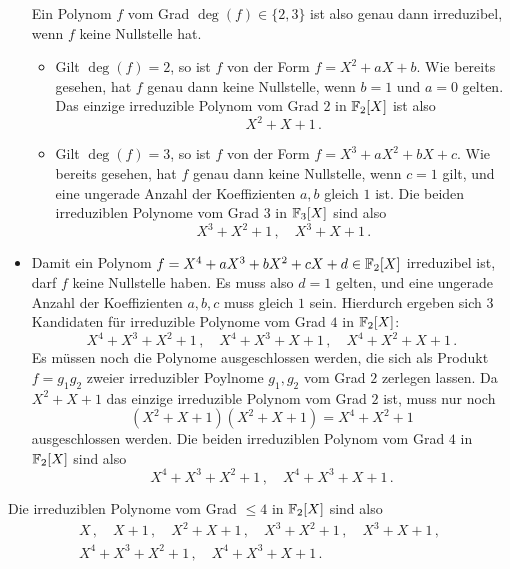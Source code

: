 \begin{itemize}
    Ein Polynom $f$ vom Grad $\deg(f) \in \{2,3\}$ ist also genau dann irreduzibel, wenn $f$ keine Nullstelle hat.
    
    \begin{itemize}
      \item
        Gilt $\deg(f) = 2$, so ist $f$ von der Form $f = X^2 + aX + b$.
        Wie bereits gesehen, hat $f$ genau dann keine Nullstelle, wenn $b = 1$ und $a = 0$ gelten.
        Das einzige irreduzible Polynom vom Grad $2$ in $\mathbb{F}_2[X]$ ist also
        \[
          X^2 + X + 1 \,.
        \]
      \item
        Gilt $\deg(f) = 3$, so ist $f$ von der Form $f = X^3 + aX^2 + bX + c$.
        Wie bereits gesehen, hat $f$ genau dann keine Nullstelle, wenn $c = 1$ gilt, und eine ungerade Anzahl der Koeffizienten $a, b$ gleich $1$ ist.
        Die beiden irreduziblen Polynome vom Grad $3$ in $\mathbb{F}_3[X]$ sind also
        \[
          X^3 + X^2 + 1 \,,
          \quad
          X^3 + X + 1 \,.
        \]
    \end{itemize}
    
  \item
    Damit ein Polynom $f = X^4 + aX^3 + bX^2 + cX + d \in \mathbb{F}_2[X]$ irreduzibel ist, darf $f$ keine Nullstelle haben.
    Es muss also $d = 1$ gelten, und eine ungerade Anzahl der Koeffizienten $a, b, c$ muss gleich $1$ sein.
    Hierdurch ergeben sich $3$ Kandidaten für irreduzible Polynome vom Grad $4$ in $\mathbb{F}_2[X]$:
    \[
      X^4 + X^3 + X^2 + 1 \,,
      \quad
      X^4 + X^3 + X + 1 \,,
      \quad
      X^4 + X^2 + X + 1 \,.
    \]
    Es müssen noch die Polynome ausgeschlossen werden, die sich als Produkt $f = g_1 g_2$ zweier irreduzibler Poylnome $g_1, g_2$ vom Grad $2$ zerlegen lassen.
    Da $X^2 + X + 1$ das einzige irreduzible Polynom vom Grad $2$ ist, muss nur noch
    \[
        (X^2 + X + 1)(X^2 + X + 1)
      = X^4 + X^2 + 1
    \]
    ausgeschlossen werden.
    Die beiden irreduziblen Polynom vom Grad $4$ in $\mathbb{F}_2[X]$ sind also
    \[
      X^4 + X^3 + X^2 + 1 \,,
      \quad
      X^4 + X^3 + X + 1 \,.
    \]
\end{itemize}

Die irreduziblen Polynome vom Grad $\leq 4$ in $\mathbb{F}_2[X]$ sind also
\begin{gather*}
  X \,,
  \quad
  X+1 \,,
  \quad
  X^2 + X + 1 \,,
  \quad
  X^3 + X^2 + 1 \,,
  \quad
  X^3 + X + 1 \,,
  \\
  X^4 + X^3 + X^2 + 1 \,,
  \quad
  X^4 + X^3 + X + 1 \,.
\end{gather*}





